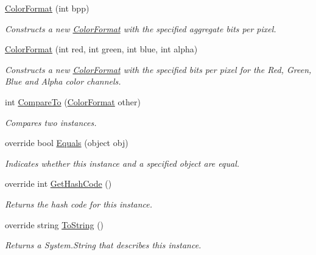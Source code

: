 \begin{DoxyCompactItemize}
\item 
\hyperlink{struct_open_t_k_1_1_graphics_1_1_color_format_a262534ad50bf741194bff39dbcfcb950}{Color\-Format} (int bpp)
\begin{DoxyCompactList}\small\item\em Constructs a new \hyperlink{struct_open_t_k_1_1_graphics_1_1_color_format}{Color\-Format} with the specified aggregate bits per pixel. \end{DoxyCompactList}\item 
\hyperlink{struct_open_t_k_1_1_graphics_1_1_color_format_a9cdfebc1a1e1aba0e081583f986eb6e5}{Color\-Format} (int red, int green, int blue, int alpha)
\begin{DoxyCompactList}\small\item\em Constructs a new \hyperlink{struct_open_t_k_1_1_graphics_1_1_color_format}{Color\-Format} with the specified bits per pixel for the Red, Green, Blue and Alpha color channels. \end{DoxyCompactList}\item 
int \hyperlink{struct_open_t_k_1_1_graphics_1_1_color_format_a2e4e82cbfde750750c6748592170832b}{Compare\-To} (\hyperlink{struct_open_t_k_1_1_graphics_1_1_color_format}{Color\-Format} other)
\begin{DoxyCompactList}\small\item\em Compares two instances. \end{DoxyCompactList}\item 
override bool \hyperlink{struct_open_t_k_1_1_graphics_1_1_color_format_a5ff31074a27d6ade88db72509250a898}{Equals} (object obj)
\begin{DoxyCompactList}\small\item\em Indicates whether this instance and a specified object are equal. \end{DoxyCompactList}\item 
override int \hyperlink{struct_open_t_k_1_1_graphics_1_1_color_format_a005691420c2f78e61862a136d862f72a}{Get\-Hash\-Code} ()
\begin{DoxyCompactList}\small\item\em Returns the hash code for this instance. \end{DoxyCompactList}\item 
override string \hyperlink{struct_open_t_k_1_1_graphics_1_1_color_format_a37a2680f45d79afdf6e057c1dec4ec17}{To\-String} ()
\begin{DoxyCompactList}\small\item\em Returns a System.\-String that describes this instance. \end{DoxyCompactList}\end{DoxyCompactItemize}

